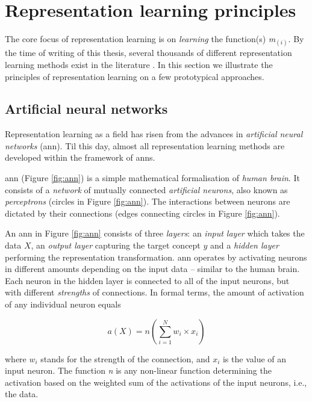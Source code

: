 \section{Representation learning principles}


The core focus of representation learning is on \textit{learning} the function(s) \textit{m}$_{(i)}$.
By the time of writing of this thesis, several thousands of different representation learning methods exist in the literature \cite{Goodfellow2016}.
In this section we illustrate the principles of representation learning on a few prototypical approaches.


\subsection{Artificial neural networks}



Representation learning as a field has risen from the advances in \textit{artificial neural networks} (\gls{ann}).
Til this day, almost all representation learning methods are developed within the framework of \gls{ann}s.


\gls{ann} (Figure \ref{fig:ann}) is a simple mathematical formalisation of \textit{human brain}.
It consists of a \textit{network} of mutually connected \textit{artificial neurons}, also known as \textit{perceptrons} (circles in Figure \ref{fig:ann}).
The interactions between neurons are dictated by their connections (edges connecting circles in Figure \ref{fig:ann}).


An \gls{ann} in Figure \ref{fig:ann} consists of three \textit{layers}: an \textit{input layer} which takes the data $X$, an \textit{output layer} capturing the target concept $y$ and a \textit{hidden layer} performing the representation transformation.
\gls{ann} operates by activating neurons in different amounts depending on the input data -- similar to the human brain.
Each neuron in the hidden layer is connected to all of the input neurons, but with different \textit{strengths} of connections.
In formal terms, the amount of activation of any individual neuron equals

\begin{equation}
	a(X) = n(\sum_{i=1}^N w_i \times x_i)
\end{equation} 

where $w_i$ stands for the strength of the connection, and $x_i$ is the value of an input neuron.
The function \textit{n} is any non-linear function determining the activation based on the weighted sum of the activations of the input neurons, i.e., the data.




